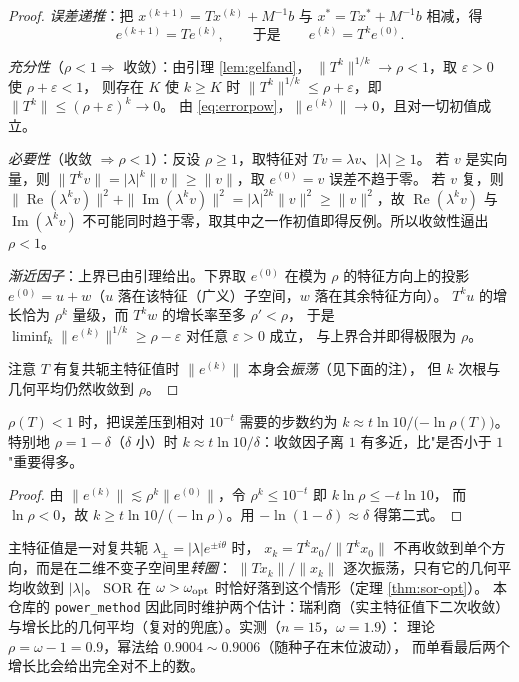\begin{proof}
\emph{误差递推}：把 $x^{(k+1)}=Tx^{(k)}+M^{-1}b$ 与 $x^\ast=Tx^\ast+M^{-1}b$ 相减，得
\begin{equation}
  e^{(k+1)}=Te^{(k)},\qquad\text{于是}\qquad e^{(k)}=T^ke^{(0)} .
  \label{eq:errorpow}
\end{equation}

\emph{充分性}（$\rho<1\Rightarrow$ 收敛）：由引理 \ref{lem:gelfand}，
$\|T^k\|^{1/k}\to\rho<1$，取 $\varepsilon>0$ 使 $\rho+\varepsilon<1$，
则存在 $K$ 使 $k\ge K$ 时 $\|T^k\|^{1/k}\le\rho+\varepsilon$，即 $\|T^k\|\le(\rho+\varepsilon)^k\to0$。
由 \eqref{eq:errorpow}，$\|e^{(k)}\|\to0$，且对一切初值成立。

\emph{必要性}（收敛 $\Rightarrow\rho<1$）：反设 $\rho\ge1$，取特征对 $Tv=\lambda v$、$|\lambda|\ge1$。
若 $v$ 是实向量，则 $\|T^kv\|=|\lambda|^k\|v\|\ge\|v\|$，取 $e^{(0)}=v$ 误差不趋于零。
若 $v$ 复，则 $\|\operatorname{Re}(\lambda^kv)\|^2+\|\operatorname{Im}(\lambda^kv)\|^2
=|\lambda|^{2k}\|v\|^2\ge\|v\|^2$，故 $\operatorname{Re}(\lambda^kv)$ 与 $\operatorname{Im}(\lambda^kv)$
不可能同时趋于零，取其中之一作初值即得反例。所以收敛性逼出 $\rho<1$。

\emph{渐近因子}：上界已由引理给出。下界取 $e^{(0)}$ 在模为 $\rho$ 的特征方向上的投影
$e^{(0)}=u+w$（$u$ 落在该特征（广义）子空间，$w$ 落在其余特征方向）。
$T^ku$ 的增长恰为 $\rho^k$ 量级，而 $T^kw$ 的增长率至多 $\rho'<\rho$，
于是 $\liminf_k\|e^{(k)}\|^{1/k}\ge\rho-\varepsilon$ 对任意 $\varepsilon>0$ 成立，
与上界合并即得极限为 $\rho$。

注意 $T$ 有复共轭主特征值时 $\|e^{(k)}\|$ 本身会\emph{振荡}（见下面的注），
但 $k$ 次根与几何平均仍然收敛到 $\rho$。
\end{proof}

\begin{corollary}[达到精度要多少步]
\label{cor:steps}
$\rho(T)<1$ 时，把误差压到相对 $10^{-t}$ 需要的步数约为
$k\approx t\ln10\bigl/(-\ln\rho(T)\bigr)$。特别地 $\rho=1-\delta$（$\delta$ 小）时
$k\approx t\ln10/\delta$：收敛因子离 $1$ 有多近，比"是否小于 $1$"重要得多。
\end{corollary}

\begin{proof}
由 $\|e^{(k)}\|\lesssim\rho^k\|e^{(0)}\|$，令 $\rho^k\le10^{-t}$ 即 $k\ln\rho\le-t\ln10$，
而 $\ln\rho<0$，故 $k\ge t\ln10/(-\ln\rho)$。用 $-\ln(1-\delta)\approx\delta$ 得第二式。
\end{proof}

\begin{remark}
\label{rem:complex}
主特征值是一对复共轭 $\lambda_\pm=|\lambda|e^{\pm i\theta}$ 时，
$x_k=T^kx_0/\|T^kx_0\|$ 不再收敛到单个方向，而是在二维不变子空间里\emph{转圈}：
$\|Tx_k\|/\|x_k\|$ 逐次振荡，只有它的几何平均收敛到 $|\lambda|$。
SOR 在 $\omega>\omega_{\rm opt}$ 时恰好落到这个情形（定理 \ref{thm:sor-opt}）。
本仓库的 \texttt{power\_method} 因此同时维护两个估计：瑞利商（实主特征值下二次收敛）
与增长比的几何平均（复对的兜底）。实测（$n=15$，$\omega=1.9$）：
理论 $\rho=\omega-1=0.9$，幂法给 $0.9004\sim0.9006$（随种子在末位波动），
而单看最后两个增长比会给出完全对不上的数。
\end{remark}

